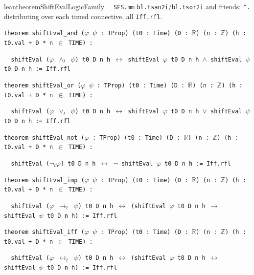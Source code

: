 \begin{restatable}{leantheorem}{ShiftEvalLogicFamily}~~ \texttt{SFS.mm} \texttt{bl.tsan2i}/\texttt{bl.tsor2i} and friends: \texttt{\^{}.} distributing over each timed connective, all \texttt{Iff.rfl}.

\texttt{\textcolor{leancolor}{theorem} \textcolor{leanyellow}{shiftEval\_and} ($\varphi$ $\psi$ : TProp) (t0 : Time) (D : $\mathbb{R}$) (n : $\mathbb{Z}$) (h : t0.val + D * n $\in$ TIME) :}

\texttt{~~shiftEval ($\varphi$ $\wedge_t$ $\psi$) t0 D n h $\leftrightarrow$ shiftEval $\varphi$ t0 D n h $\wedge$ shiftEval $\psi$ t0 D n h := Iff.rfl}

\texttt{\textcolor{leancolor}{theorem} \textcolor{leanyellow}{shiftEval\_or} ($\varphi$ $\psi$ : TProp) (t0 : Time) (D : $\mathbb{R}$) (n : $\mathbb{Z}$) (h : t0.val + D * n $\in$ TIME) :}

\texttt{~~shiftEval ($\varphi$ $\vee_t$ $\psi$) t0 D n h $\leftrightarrow$ shiftEval $\varphi$ t0 D n h $\vee$ shiftEval $\psi$ t0 D n h := Iff.rfl}

\texttt{\textcolor{leancolor}{theorem} \textcolor{leanyellow}{shiftEval\_not} ($\varphi$ : TProp) (t0 : Time) (D : $\mathbb{R}$) (n : $\mathbb{Z}$) (h : t0.val + D * n $\in$ TIME) :}

\texttt{~~shiftEval ($\neg_t$$\varphi$) t0 D n h $\leftrightarrow$ $\neg$ shiftEval $\varphi$ t0 D n h := Iff.rfl}

\texttt{\textcolor{leancolor}{theorem} \textcolor{leanyellow}{shiftEval\_imp} ($\varphi$ $\psi$ : TProp) (t0 : Time) (D : $\mathbb{R}$) (n : $\mathbb{Z}$) (h : t0.val + D * n $\in$ TIME) :}

\texttt{~~shiftEval ($\varphi$ $\to_t$ $\psi$) t0 D n h $\leftrightarrow$ (shiftEval $\varphi$ t0 D n h $\to$ shiftEval $\psi$ t0 D n h) := Iff.rfl}

\texttt{\textcolor{leancolor}{theorem} \textcolor{leanyellow}{shiftEval\_iff} ($\varphi$ $\psi$ : TProp) (t0 : Time) (D : $\mathbb{R}$) (n : $\mathbb{Z}$) (h : t0.val + D * n $\in$ TIME) :}

\texttt{~~shiftEval ($\varphi$ $\leftrightarrow_t$ $\psi$) t0 D n h $\leftrightarrow$ (shiftEval $\varphi$ t0 D n h $\leftrightarrow$ shiftEval $\psi$ t0 D n h) := Iff.rfl}
\label{shiftEval_and}
\label{shiftEval_or}
\label{shiftEval_not}
\label{shiftEval_imp}
\label{shiftEval_iff}
\end{restatable}

